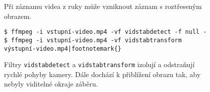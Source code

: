 \begingroup
\begin{subfigure}{\linewidth}

\vspace{-4pt}

\caption{Při záznamu videa z ruky může vzniknout záznam s roztřeseným obrazem.}
\end{subfigure}
\par\vspace{7.5pt}%
%
\begin{subfigure}{\linewidth}
\begingroup
\small
\begin{Verbatim}[commandchars=|\{\}]
$ ffmpeg -i vstupní-video.mp4 -vf vidstabdetect -f null -
$ ffmpeg -i vstupní-video.mp4 -vf vidstabtransform výstupní-video.mp4|footnotemark{}
\end{Verbatim}
\vspace{-4pt}%
\endgroup

\caption{Filtry \texttt{vidstabdetect} a \texttt{vidstabtransform} izolují a odstraňují rychlé pohyby kamery. Dále dochází k přiblížení obrazu tak, aby nebyly viditelné okraje záběru.}
\end{subfigure}
\endgroup
